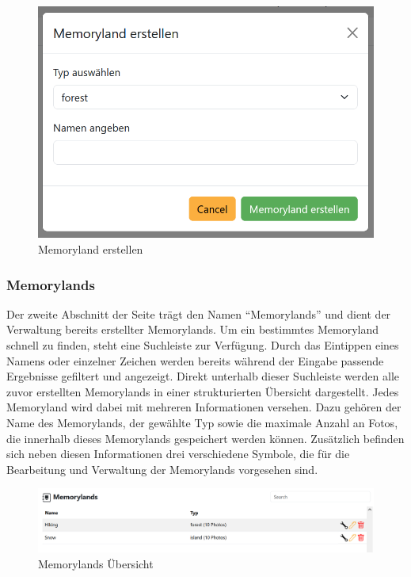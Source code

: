 \begin{figure}
    \centering
    \includegraphics[scale=0.5]{pics/all_worlds_teil1_button.PNG}
    \caption{Memoryland erstellen}
    \label{fig:all-worlds-memoryland-erstellen}
\end{figure}

\subsubsection{Memorylands}

Der zweite Abschnitt der Seite trägt den Namen ``Memorylands'' und dient der 
Verwaltung bereits erstellter Memorylands. Um ein bestimmtes Memoryland schnell 
zu finden, steht eine Suchleiste zur Verfügung. Durch das Eintippen eines Namens 
oder einzelner Zeichen werden bereits während der Eingabe passende Ergebnisse 
gefiltert und angezeigt. Direkt unterhalb dieser Suchleiste werden alle zuvor 
erstellten Memorylands in einer strukturierten Übersicht dargestellt. Jedes 
Memoryland wird dabei mit mehreren Informationen versehen. Dazu gehören der 
Name des Memorylands, der gewählte Typ sowie die maximale Anzahl an Fotos, die 
innerhalb dieses Memorylands gespeichert werden können. Zusätzlich befinden sich 
neben diesen Informationen drei verschiedene Symbole, die für die Bearbeitung und 
Verwaltung der Memorylands vorgesehen sind.

\begin{figure} [h t]
    \centering
    \includegraphics[scale=0.6]{pics/all_worlds_teil2.PNG}
    \caption{Memorylands Übersicht}
    \label{fig:all-worlds-memorylands}
\end{figure}

